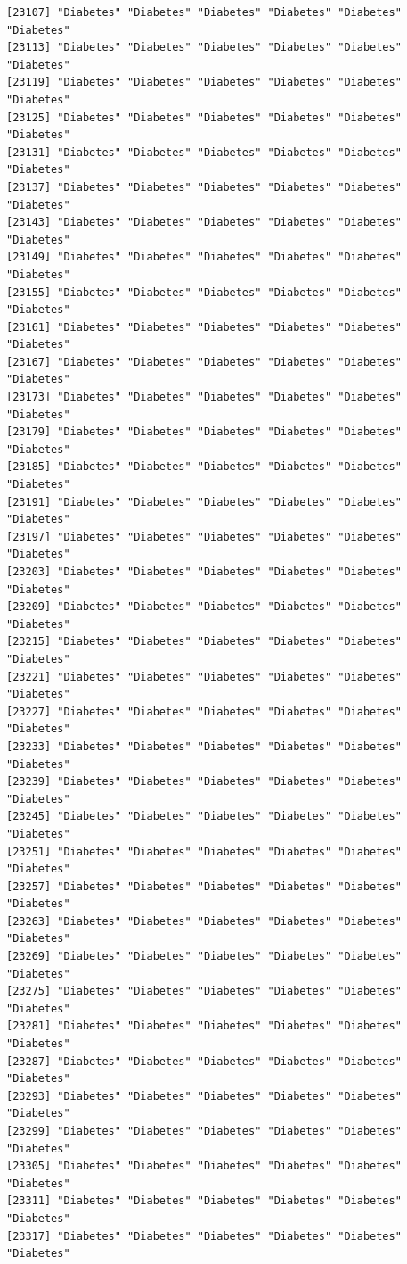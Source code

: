 \documentclass[
  letterpaper,
  DIV=11,
  numbers=noendperiod]{scrartcl}
\begin{document}
\begin{verbatim}
[23107] "Diabetes" "Diabetes" "Diabetes" "Diabetes" "Diabetes" "Diabetes"
[23113] "Diabetes" "Diabetes" "Diabetes" "Diabetes" "Diabetes" "Diabetes"
[23119] "Diabetes" "Diabetes" "Diabetes" "Diabetes" "Diabetes" "Diabetes"
[23125] "Diabetes" "Diabetes" "Diabetes" "Diabetes" "Diabetes" "Diabetes"
[23131] "Diabetes" "Diabetes" "Diabetes" "Diabetes" "Diabetes" "Diabetes"
[23137] "Diabetes" "Diabetes" "Diabetes" "Diabetes" "Diabetes" "Diabetes"
[23143] "Diabetes" "Diabetes" "Diabetes" "Diabetes" "Diabetes" "Diabetes"
[23149] "Diabetes" "Diabetes" "Diabetes" "Diabetes" "Diabetes" "Diabetes"
[23155] "Diabetes" "Diabetes" "Diabetes" "Diabetes" "Diabetes" "Diabetes"
[23161] "Diabetes" "Diabetes" "Diabetes" "Diabetes" "Diabetes" "Diabetes"
[23167] "Diabetes" "Diabetes" "Diabetes" "Diabetes" "Diabetes" "Diabetes"
[23173] "Diabetes" "Diabetes" "Diabetes" "Diabetes" "Diabetes" "Diabetes"
[23179] "Diabetes" "Diabetes" "Diabetes" "Diabetes" "Diabetes" "Diabetes"
[23185] "Diabetes" "Diabetes" "Diabetes" "Diabetes" "Diabetes" "Diabetes"
[23191] "Diabetes" "Diabetes" "Diabetes" "Diabetes" "Diabetes" "Diabetes"
[23197] "Diabetes" "Diabetes" "Diabetes" "Diabetes" "Diabetes" "Diabetes"
[23203] "Diabetes" "Diabetes" "Diabetes" "Diabetes" "Diabetes" "Diabetes"
[23209] "Diabetes" "Diabetes" "Diabetes" "Diabetes" "Diabetes" "Diabetes"
[23215] "Diabetes" "Diabetes" "Diabetes" "Diabetes" "Diabetes" "Diabetes"
[23221] "Diabetes" "Diabetes" "Diabetes" "Diabetes" "Diabetes" "Diabetes"
[23227] "Diabetes" "Diabetes" "Diabetes" "Diabetes" "Diabetes" "Diabetes"
[23233] "Diabetes" "Diabetes" "Diabetes" "Diabetes" "Diabetes" "Diabetes"
[23239] "Diabetes" "Diabetes" "Diabetes" "Diabetes" "Diabetes" "Diabetes"
[23245] "Diabetes" "Diabetes" "Diabetes" "Diabetes" "Diabetes" "Diabetes"
[23251] "Diabetes" "Diabetes" "Diabetes" "Diabetes" "Diabetes" "Diabetes"
[23257] "Diabetes" "Diabetes" "Diabetes" "Diabetes" "Diabetes" "Diabetes"
[23263] "Diabetes" "Diabetes" "Diabetes" "Diabetes" "Diabetes" "Diabetes"
[23269] "Diabetes" "Diabetes" "Diabetes" "Diabetes" "Diabetes" "Diabetes"
[23275] "Diabetes" "Diabetes" "Diabetes" "Diabetes" "Diabetes" "Diabetes"
[23281] "Diabetes" "Diabetes" "Diabetes" "Diabetes" "Diabetes" "Diabetes"
[23287] "Diabetes" "Diabetes" "Diabetes" "Diabetes" "Diabetes" "Diabetes"
[23293] "Diabetes" "Diabetes" "Diabetes" "Diabetes" "Diabetes" "Diabetes"
[23299] "Diabetes" "Diabetes" "Diabetes" "Diabetes" "Diabetes" "Diabetes"
[23305] "Diabetes" "Diabetes" "Diabetes" "Diabetes" "Diabetes" "Diabetes"
[23311] "Diabetes" "Diabetes" "Diabetes" "Diabetes" "Diabetes" "Diabetes"
[23317] "Diabetes" "Diabetes" "Diabetes" "Diabetes" "Diabetes" "Diabetes"

\end{verbatim}
\end{document}
